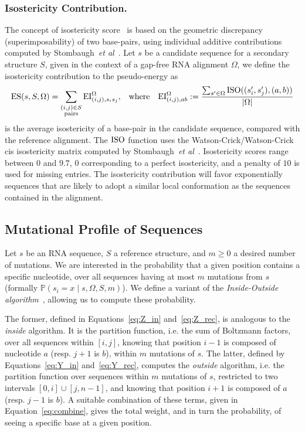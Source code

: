 \subsubsection{Isostericity Contribution.}
The concept of isostericity score~\cite{Stombaugh2009} is based on the geometric discrepancy (superimposability) of two base-pairs, using individual additive contributions computed by Stombaugh~\emph{et al}~\cite{Stombaugh2009}. Let $s$ be a candidate sequence for a secondary structure $S$, given in the context of a gap-free RNA alignment $\Omega$,  we define the isostericity contribution to the pseudo-energy as
\begin{align*}
  \text{ES}(s,S,\Omega) &= \sum_{\substack{(i,j)\in S\\ \text{pairs}}}\text{EI}^{\Omega}_{(i,j),s_i s_j}, & \text{where}&& 	\text{EI}^{\Omega}_{(i,j),ab}:=
	\frac{
		\sum_{s'\in\Omega}
			\text{\text{ISO}}((s_i',s_j'),(a,b))}
{		
		|\Omega|
	}
\end{align*}
is the average isostericity of a base-pair in the candidate sequence, compared with the reference alignment.
The $\text{ISO}$ function uses the {Watson-Crick/Watson-Crick} cis isostericity matrix computed by Stombaugh~\emph{et al}~\cite{Stombaugh2009}. Isostericity scores range between $0$ and $9.7$, $0$ corresponding to a perfect isostericity, and a penalty of $10$ is used for missing entries.
The isostericity contribution will favor exponentially sequences that are likely to adopt a similar local conformation as the sequences contained in the alignment.

\subsection{Mutational Profile of Sequences}


Let $s$ be an RNA sequence, $S$ a reference structure, and $m\geq 0$ a desired number of mutations. 
We are interested in  the probability that a given position contains a specific nucleotide, over all sequences having at most $m$ mutations from $s$
(formally $\mathbb{P}(s_i = x\mid s,\Omega, S,m)$). 
We define a variant of the
 \emph{Inside-Outside algorithm}~\cite{Lari1990}, allowing us to compute these
 probability. 

The former, defined in Equations~\eqref{eq:Z_in} and~\eqref{eq:Z_rec}, is analogous to the \emph{inside} algorithm.
It is the partition function, i.e. the sum of Boltzmann factors, over all sequences within $[i,j]$, 
knowing that position $i-1$ is composed of nucleotide $a$ (resp. $j+1$ is $b$), within 
$m$ mutations of $s$. The latter, defined by Equations~\eqref{eq:Y_in} and~\eqref{eq:Y_rec},
 computes the \emph{outside} algorithm, i.e.  
the partition function over sequences within $m$ mutations of $s$, restricted to two intervals $[0,i]\cup[j,n-1]$, and 
knowing  that position $i+1$ is composed of $a$ (resp. $j-1$ is $b$). A suitable combination of these terms, given in Equation~\eqref{eq:combine}, gives the total weight, and in turn the probability, of seeing a specific base at a given position.

